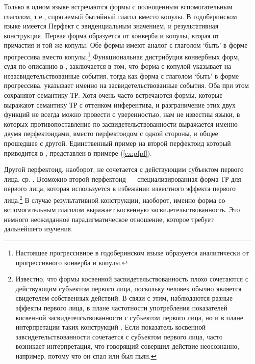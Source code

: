 Только в одном языке встречаются формы с полноценным вспомогательным глаголом, т.е., спрягаемый бытийный глагол вместо копулы. В годоберинском языке имеется Перфект с эвиденциальным значением, и результативная конструкция. Первая форма образуется от конверба и копулы, вторая от причастия и той же копулы. Обе формы имеют аналог с глаголом `быть' в форме прогрессива вместо копулы.\footnote{Настоящее прогрессивное в годоберинском языке образуется аналитически от прогрессивного конверба и копулы.} Функциональная дистрибуция конвербных форм, судя по описанию в \citep{dobrushinatatevosov1996}, заключается в том, что форма с копулой указывает на незасвидетельствованные события, тогда как форма с глаголом `быть' в форме прогрессива, указывает именно на засвидетельствованные события. Оба при этом сохраняют семантику ТР. Хотя очень часто встречаются формы, которые выражают семантику ТР с оттенком инферентива, и разграничение этих двух функций не всегда можно провести с уверенностью, нам не известны языки, в которых противопоставление по засвидетельствованности выражается именно двумя перфектоидами, вместо перфектоидом с одной стороны, и общее прошедшее с другой. Единственный пример на второй перфектоид который приводится в \citep{dobrushinatatevosov1996}, представлен в примере (\ref{ex:pfpf}).


Другой перфектоид, наоборот, не сочетается с действующим субъектом первого лица, ср. \citep[94]{dobrushinatatevosov1996}. Возможно второй перфектоид --- специализированная форма ТР для первого лица, которая используется в избежании известного эффекта первого лица.\footnote{Известно, что формы косвенной засвидетельствованность плохо сочетаются с действующим субъектом первого лица, поскольку человек обычно является свидетелем собственных действий. В связи с этим, наблюдаются разные эффекты первого лица, в плане частотности употребления показателей косвенной засвидетелсьтвованности с субъектом первого лица, но и в плане интерпретации таких конструкций \citep{curnow2002}. Если показатель косвенной завсидетельствованности сочетается с субъектом первого лица, часто возникает интерпретация, что говорящий совершил действие неосознанно, например, потому что он спал или был пьян.} В случае результативной конструкции, наоборот, именно форма со вспомогательным глаголом выражает косвенную засвидетельствованность. Это немного неожиданное парадигматическое отношение, которое требует дальнейшего изучения.

